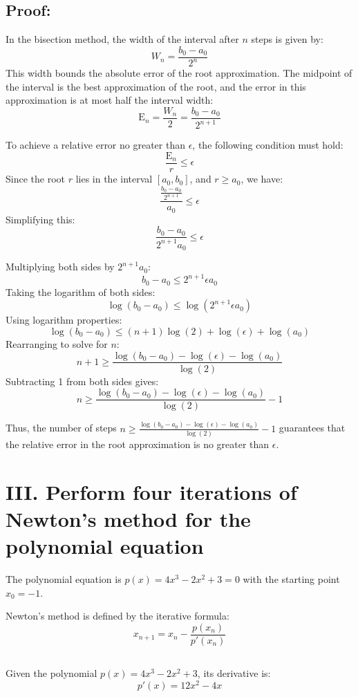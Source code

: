 \documentclass[a4paper]{article}
\begin{document}
\subsection*{Proof:}

   In the bisection method, the width of the interval after $n$ steps is given by:
   \[
   W_n = \frac{b_0 - a_0}{2^n}
   \]
   This width bounds the absolute error of the root approximation. The midpoint of the interval is the best approximation of the root, and the error in this approximation is at most half the interval width:
   \[
   \text{E}_n = \frac{W_n}{2} = \frac{b_0 - a_0}{2^{n+1}}
   \]


   To achieve a relative error no greater than $\epsilon$, the following condition must hold:
   \[
   \frac{\text{E}_n}{r} \leq \epsilon
   \]
   Since the root $r$ lies in the interval $[a_0, b_0]$, and $r \geq a_0$, we have:
   \[
   \frac{\frac{b_0 - a_0}{2^{n+1}}}{a_0} \leq \epsilon
   \]
   Simplifying this:
   \[
   \frac{b_0 - a_0}{2^{n+1} a_0} \leq \epsilon
   \]
   

Multiplying both sides by $2^{n+1} a_0$:
   \[
   b_0 - a_0 \leq 2^{n+1} \epsilon a_0
   \]
   Taking the logarithm of both sides:
   \[
   \log(b_0 - a_0) \leq \log(2^{n+1} \epsilon a_0)
   \]
   Using logarithm properties:
   \[
   \log(b_0 - a_0) \leq (n+1) \log(2) + \log(\epsilon) + \log(a_0)
   \]
   Rearranging to solve for $n$:
   \[
   n+1 \geq \frac{\log(b_0 - a_0) - \log(\epsilon) - \log(a_0)}{\log(2)}
   \]
   Subtracting 1 from both sides gives:
   \[
   n \geq \frac{\log(b_0 - a_0) - \log(\epsilon) - \log(a_0)}{\log(2)} - 1
   \]


   Thus, the number of steps $n \geq \frac{\log(b_0 - a_0) - \log(\epsilon) - \log(a_0)}{\log(2)} - 1$ guarantees that the relative error in the root approximation is no greater than $\epsilon$. 

\section*{III. Perform four iterations of Newton’s method for the polynomial equation }
The polynomial equation is $p(x) = 4x^3 - 2x^2 + 3 = 0$ with the starting point $x_0 = -1$.

Newton's method is defined by the iterative formula:
\[
x_{n+1} = x_n - \frac{p(x_n)}{p'(x_n)}
\]

\subsection*{}
Given the polynomial \( p(x) = 4x^3 - 2x^2 + 3 \), its derivative is:
\[
p'(x) = 12x^2 - 4x
\]
\end{document}
